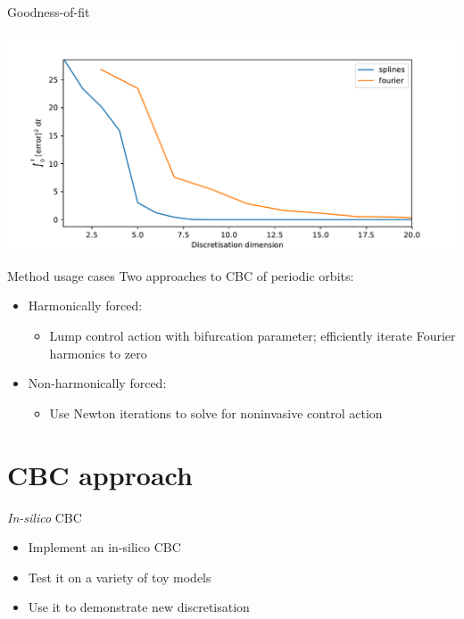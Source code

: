 \documentclass[presentation]{beamer}
\begin{document}
\begin{frame}[label={sec:org210f615}]{Goodness-of-fit}
\begin{center}
\includegraphics[width=.9\linewidth]{./goodness.pdf}
\end{center}
\end{frame}

\begin{frame}[label={sec:orgee48d66}]{Method usage cases}
Two approaches to CBC of periodic orbits:
\vfill
\begin{itemize}
\item Harmonically forced:
\begin{itemize}
\item Lump control action with bifurcation parameter; efficiently iterate Fourier harmonics to zero
\end{itemize}
\end{itemize}

\vfill
\begin{itemize}
\item Non-harmonically forced:
\begin{itemize}
\item Use Newton iterations to solve for noninvasive control action
\end{itemize}
\end{itemize}
\end{frame}

\section{CBC approach}
\label{sec:orgc4a3201}
\begin{frame}[label={sec:org8f76599}]{\emph{In-silico} CBC}
\begin{itemize}
\item Implement an in-silico CBC
\end{itemize}
\vfill
\begin{itemize}
\item Test it on a variety of toy models
\end{itemize}
\vfill
\begin{itemize}
\item Use it to demonstrate new discretisation
\end{itemize}
\end{frame}
\end{document}
